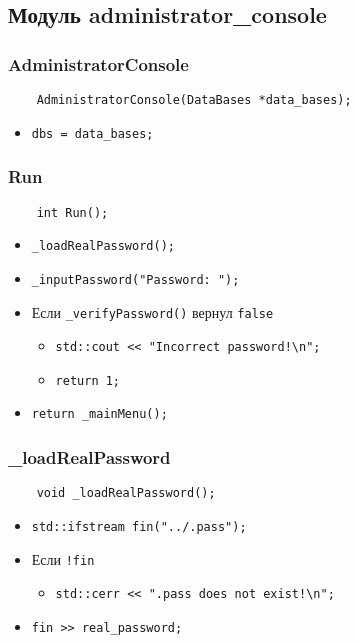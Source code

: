 \subsection{Модуль administrator\_console}

\subsubsection{AdministratorConsole}

\begin{lstlisting}
    AdministratorConsole(DataBases *data_bases);
\end{lstlisting}

\begin{itemize}
    \item \verb|dbs = data_bases;|
\end{itemize}

\subsubsection{Run}

\begin{lstlisting}
    int Run();
\end{lstlisting}

\begin{itemize}
    \item \verb|_loadRealPassword();|
    \item \verb|_inputPassword("Password: ");|
    \item Если \verb|_verifyPassword()| вернул \verb|false|
        \begin{itemize}
            \item \verb|std::cout << "Incorrect password!\n";|
            \item \verb|return 1;|
        \end{itemize}
    \item \verb|return _mainMenu();|
\end{itemize}

\subsubsection{\_loadRealPassword}

\begin{lstlisting}
    void _loadRealPassword();
\end{lstlisting}

\begin{itemize}
    \item \verb|std::ifstream fin("../.pass");|
    \item Если \verb|!fin|
    \begin{itemize}
        \item \verb|std::cerr << ".pass does not exist!\n";|
    \end{itemize}
    \item \verb|fin >> real_password;|
\end{itemize}


